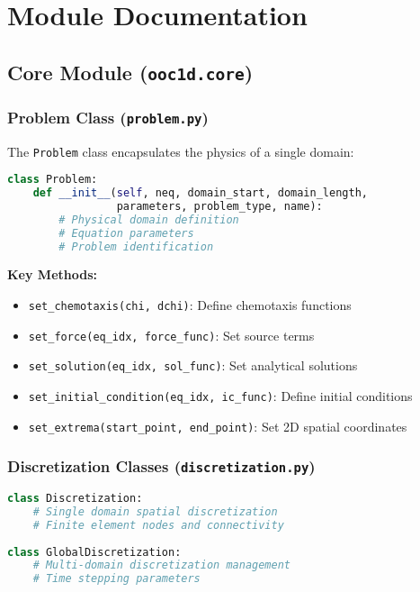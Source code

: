 \documentclass[11pt,a4paper]{article}
\newcommand{\code}[1]{\texttt{#1}}
\begin{document}
\section{Module Documentation}

\subsection{Core Module (\code{ooc1d.core})}

\subsubsection{Problem Class (\code{problem.py})}

The \code{Problem} class encapsulates the physics of a single domain:

\begin{lstlisting}[language=Python, caption={Problem Class Structure}]
class Problem:
    def __init__(self, neq, domain_start, domain_length, 
                 parameters, problem_type, name):
        # Physical domain definition
        # Equation parameters
        # Problem identification
\end{lstlisting}

\textbf{Key Methods:}
\begin{itemize}
    \item \code{set\_chemotaxis(chi, dchi)}: Define chemotaxis functions
    \item \code{set\_force(eq\_idx, force\_func)}: Set source terms
    \item \code{set\_solution(eq\_idx, sol\_func)}: Set analytical solutions
    \item \code{set\_initial\_condition(eq\_idx, ic\_func)}: Define initial conditions
    \item \code{set\_extrema(start\_point, end\_point)}: Set 2D spatial coordinates
\end{itemize}


\subsubsection{Discretization Classes (\code{discretization.py})}

\begin{lstlisting}[language=Python, caption={Discretization Classes}]
class Discretization:
    # Single domain spatial discretization
    # Finite element nodes and connectivity
    
class GlobalDiscretization:
    # Multi-domain discretization management
    # Time stepping parameters
\end{lstlisting}
\end{document}
